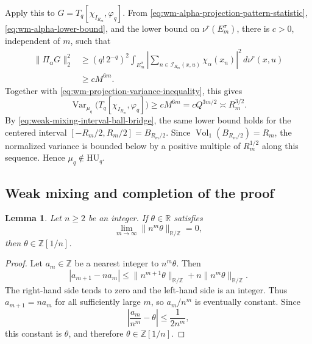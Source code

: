 \documentclass[11pt,reqno,a4paper]{amsart}
\numberwithin{equation}{section}
\theoremstyle{compact}
\newtheorem{lemma}[lemma]{Lemma}
\theoremstyle{definition}
\theoremstyle{definition}
\newcommand{\HU}{\mathrm{HU}}
\newcommand{\Var}{\operatorname{Var}}
\newcommand{\Vol}{\operatorname{Vol}}
\begin{document}
Apply this to
$G=T_q[\chi_{I_{R_m}},\varphi_q]$.  From
\eqref{eq:wm-alpha-projection-pattern-statistic},
\eqref{eq:wm-alpha-lower-bound}, and the lower bound on
$\nu^r(E_m^\sigma)$, there is $c>0$, independent of $m$, such that
\[
\begin{aligned}
  \|\Pi_\alpha G\|_2^2
  &\geq (q!\,2^{-q})^2
     \int_{E_m^\sigma}
       \left|\sum_{n\in\mathcal I_{R_m}(x,u)}
                    \chi_\alpha(x_n)\right|^2\,d\nu^r(x,u) \\
  &\geq cM^{6m}.
\end{aligned}
\]
Together with \eqref{eq:wm-projection-variance-inequality}, this gives
\begin{equation}\label{eq:wm-exceptional-variance-lower-bound}
  \Var_{\mu_q}\bigl(T_q[\chi_{I_{R_m}},\varphi_q]\bigr)
  \geq cM^{6m}
  =cQ^{3m/2}
  \asymp R_m^{3/2}.
\end{equation}
By \eqref{eq:weak-mixing-interval-ball-bridge}, the same lower bound holds
for the centered interval $[-R_m/2,R_m/2]=B_{R_m/2}$.  Since
$\Vol_1(B_{R_m/2})=R_m$, the normalized variance is bounded below by a
positive multiple of $R_m^{1/2}$ along this sequence.  Hence
$\mu_q\notin\HU_q$.

\subsection{Weak mixing and completion of the proof}
\label{subsec:wm-weak-mixing}

\begin{lemma}\label{lem:wm-base-n}
Let $n\geq2$ be an integer.  If $\theta\in\mathbb R$ satisfies
\begin{equation}\label{eq:wm-base-n-hypothesis}
  \lim_{m\to\infty}
  \|n^m\theta\|_{\mathbb R/\mathbb Z}=0,
\end{equation}
then $\theta\in\mathbb Z[1/n]$.
\end{lemma}

\begin{proof}
Let $a_m\in\mathbb Z$ be a nearest integer to $n^m\theta$.  Then
\begin{equation}\label{eq:wm-base-n-integer-difference}
  |a_{m+1}-na_m|
  \leq
  \|n^{m+1}\theta\|_{\mathbb R/\mathbb Z}
  +n\|n^m\theta\|_{\mathbb R/\mathbb Z}.
\end{equation}
The right-hand side tends to zero and the left-hand side is an integer.
Thus $a_{m+1}=na_m$ for all sufficiently large $m$, so $a_m/n^m$ is
eventually constant.  Since
\[
  \left|\frac{a_m}{n^m}-\theta\right|
  \leq\frac{1}{2n^m},
\]
this constant is $\theta$, and therefore $\theta\in\mathbb Z[1/n]$.
\end{proof}
\end{document}
